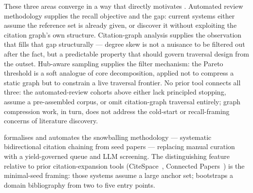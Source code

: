 These three areas converge in a way that directly motivates \ldiscover{}. Automated review
methodology supplies the recall objective and the gap: current systems either assume the
reference set is already given, or discover it without exploiting the citation graph's own
structure. Citation-graph analysis supplies the observation that fills that gap structurally ---
degree skew is not a nuisance to be filtered out after the fact, but a predictable property that
should govern traversal design from the outset. Hub-aware sampling supplies the filter
mechanism: the Pareto threshold is a soft analogue of core decomposition, applied not to
compress a static graph but to constrain a live traversal frontier. No prior tool connects all
three: the automated-review cohorts above either lack principled stopping, assume a
pre-assembled corpus, or omit citation-graph traversal entirely; graph compression work, in
turn, does not address the cold-start or recall-framing concerns of literature discovery.

\ldiscover{} formalises and automates the snowballing methodology \citep{Wohlin2014} ---
systematic bidirectional citation chaining from seed papers --- replacing manual curation
with a yield-governed queue and LLM screening. The distinguishing feature relative to prior
citation-expansion tools (CiteSpace~\citep{Chen2006}, Connected Papers~\citep{ConnectedPapers})
is the minimal-seed framing: those systems assume a large anchor set; \ldiscover{} bootstraps
a domain bibliography from two to five entry points.
